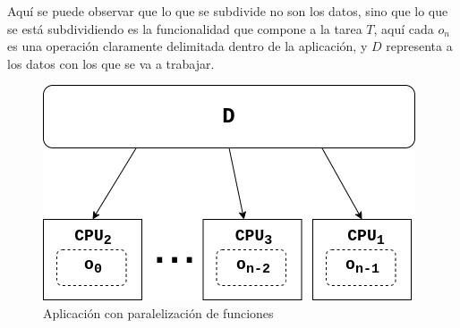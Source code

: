 
Aquí se puede observar que lo que se subdivide no son los datos, sino que lo que
se está subdividiendo es la funcionalidad que compone a la tarea $T$, aquí cada
$o_{n}$ es una operación claramente delimitada dentro de la aplicación, y $D$
representa a los datos con los que se va a trabajar.

\begin{figure}[h]
  \centering
  \includegraphics[width=0.65\linewidth]{figuras/procesamiento_paralelo_con_paralelizacion_func.png}
  \caption{Aplicación con paralelización de funciones}
  \label{fig:con_paralelizacion_funciones}
\end{figure}

